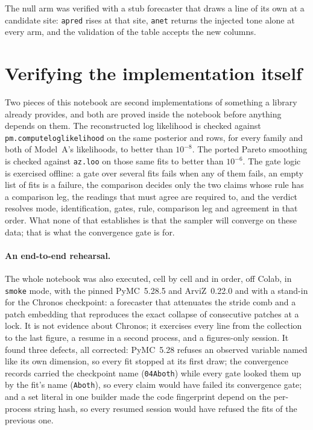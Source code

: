 \documentclass[10pt,a4paper]{article}
\newcommand{\code}[1]{\texttt{\UseBreakableUnderscores #1}}
\newcommand{\UseBreakableUnderscores}{\def\_{\textunderscore\allowbreak}}
\begin{document}
The null arm was verified with a stub forecaster that draws a line of its own at a candidate site: \code{a\_pred} rises at that site, \code{a\_net} returns the injected tone alone at every arm, and the validation of the table accepts the new columns.

\section{Verifying the implementation itself}
Two pieces of this notebook are second implementations of something a library already provides, and both are proved inside the notebook before anything depends on them. The reconstructed log likelihood is checked against \code{pm.compute\_log\_likelihood} on the same posterior and rows, for every family and both of Model~A's likelihoods, to better than $10^{-8}$. The ported Pareto smoothing is checked against \code{az.loo} on those same fits to better than $10^{-6}$. The gate logic is exercised offline: a gate over several fits fails when any of them fails, an empty list of fits is a failure, the comparison decides only the two claims whose rule has a comparison leg, the readings that must agree are required to, and the verdict resolves mode, identification, gates, rule, comparison leg and agreement in that order. What none of that establishes is that the sampler will converge on these data; that is what the convergence gate is for.

\paragraph{An end-to-end rehearsal.} The whole notebook was also executed, cell by cell and in order, off Colab, in \code{smoke} mode, with the pinned PyMC~5.28.5 and ArviZ~0.22.0 and with a stand-in for the Chronos checkpoint: a forecaster that attenuates the stride comb and a patch embedding that reproduces the exact collapse of consecutive patches at a lock. It is not evidence about Chronos; it exercises every line from the collection to the last figure, a resume in a second process, and a figures-only session. It found three defects, all corrected: PyMC~5.28 refuses an observed variable named like its own dimension, so every fit stopped at its first draw; the convergence records carried the checkpoint name (\code{04\_A\_both}) while every gate looked them up by the fit's name (\code{A\_both}), so every claim would have failed its convergence gate; and a set literal in one builder made the code fingerprint depend on the per-process string hash, so every resumed session would have refused the fits of the previous one.
\end{document}
